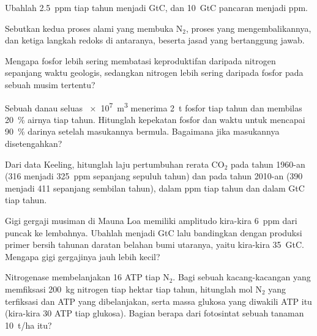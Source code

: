 \begin{exercise}[$\star$]\label{exo:b2:biogeochemical-cycles:2}
Ubahlah \qty{2.5}{ppm} tiap tahun menjadi GtC, dan \qty{10}{GtC}
pancaran menjadi ppm.
\end{exercise}

\begin{exercise}[$\star$]\label{exo:b2:biogeochemical-cycles:3}
Sebutkan kedua proses alami yang membuka $\mathrm{N_2}$, proses yang
mengembalikannya, dan ketiga langkah redoks di antaranya, beserta jasad
yang bertanggung jawab.
\end{exercise}

\begin{exercise}[$\star$]\label{exo:b2:biogeochemical-cycles:4}
Mengapa fosfor lebih sering membatasi keproduktifan daripada nitrogen
sepanjang waktu geologis, sedangkan nitrogen lebih sering daripada
fosfor pada sebuah musim tertentu?
\end{exercise}

\begin{exercise}[$\star\star$]\label{exo:b2:biogeochemical-cycles:5}
Sebuah danau seluas \qty{e7}{m^3} menerima \qty{2}{t} fosfor tiap tahun
dan membilas \qty{20}{\%} airnya tiap tahun. Hitunglah kepekatan fosfor
 dan waktu untuk mencapai \qty{90}{\%} darinya setelah
masukannya bermula. Bagaimana jika masukannya disetengahkan?
\end{exercise}

\begin{exercise}[$\star\star$]\label{exo:b2:biogeochemical-cycles:6}
Dari data Keeling, hitunglah laju pertumbuhan rerata $\mathrm{CO_2}$
pada tahun 1960-an (316 menjadi \qty{325}{ppm} sepanjang sepuluh tahun)
dan pada tahun 2010-an (390 menjadi 411 sepanjang sembilan tahun),
dalam ppm tiap tahun dan dalam GtC tiap tahun.
\end{exercise}

\begin{exercise}[$\star\star$]\label{exo:b2:biogeochemical-cycles:7}
Gigi gergaji musiman di Mauna Loa memiliki amplitudo kira-kira
\qty{6}{ppm} dari puncak ke lembahnya. Ubahlah menjadi GtC lalu
bandingkan dengan produksi primer bersih tahunan daratan belahan bumi
utaranya, yaitu kira-kira \qty{35}{GtC}. Mengapa gigi gergajinya jauh
lebih kecil?
\end{exercise}

\begin{exercise}[$\star\star$]\label{exo:b2:biogeochemical-cycles:8}
Nitrogenase membelanjakan 16 ATP tiap $\mathrm{N_2}$. Bagi sebuah
kacang-kacangan yang memfiksasi \qty{200}{kg} nitrogen tiap hektar tiap
tahun, hitunglah mol $\mathrm{N_2}$ yang terfiksasi dan ATP yang
dibelanjakan, serta massa glukosa yang diwakili ATP itu (kira-kira 30
ATP tiap glukosa). Bagian berapa dari fotosintat sebuah tanaman
\qty{10}{t/ha} itu?
\end{exercise}

